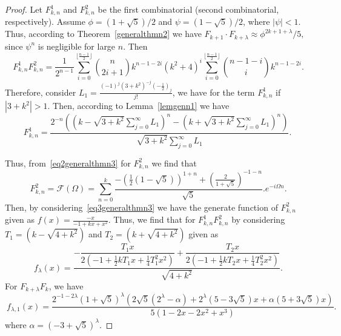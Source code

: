 \documentclass[11pt, a4paper]{article}
\theoremstyle{definition}
\begin{document}
\begin{proof}
Let $F^{1}_{k,n}$ and $F^{2}_{k,n}$ be the first combinatorial (second combinatorial, respectively). Assume $\phi = (1 + \sqrt{5})/2$ and $\psi = (1 - \sqrt{5})/2$, where $|\psi| < 1$. Thus, according to Theorem~\ref{generalthmn2} we have $F_{k+1} \cdot F_{k+\lambda} \approx \phi^{2k+1+\lambda}/5,$ since $\psi^n$ is negligible for large $n$. Then 
\begin{equation}~\label{eq2generalthmn3}
 F^{1}_{k,n}F^{2}_{k,n}= \frac{1}{2^{n-1}} \sum_{i=0}^{\lfloor \frac{n-1}{2} \rfloor} \binom{n}{2i+1} k^{n-1-2i} (k^2+4)^i  \sum_{i=0}^{\lfloor \frac{n-1}{2} \rfloor} \binom{n-1-i}{i} k^{n-1-2i}.  
\end{equation}
Therefore, consider $L_1=\frac{(-1)^j (3 + k^2)^{-j} \left( -\frac{1}{2} \right)_j}{j!}$, we have for the term $F^{1}_{k,n}$ if $|3+k^2|>1$. Then,  according to Lemma~\ref{lemgenn1} we have
\[
F^{1}_{k,n}=\frac{ 2^{-n} \left(  \left(  k - \sqrt{3 + k^2} \sum_{j=0}^{\infty} L_1 \right)^n - \left( k + \sqrt{3 + k^2} \sum_{j=0}^{\infty} L_1 \right)^n \right) }{
    \sqrt{3 + k^2} \sum_{j=0}^{\infty} L_1 }.
\]

Thus, from~\eqref{eq2generalthmn3} for $F^{2}_{k,n}$ we find that 
\begin{equation}~\label{eq3generalthmn3}
F^{2}_{k,n}=\mathcal{F}(\Omega) = \sum_{n=0}^{k}\frac{-\left(\frac{1}{2} \left(1-\sqrt{5}\right)\right)^{1+n}+\left(\frac{2}{1+\sqrt{5}}\right)^{-1-n}}{\sqrt{5}}. e^{-i \Omega n}.
\end{equation}
Then, by considering~\eqref{eq3generalthmn3} we have the generate function of $F^{2}_{k,n}$ given as $f(x)=\frac{-x}{-1+kx+x^2}.$
Thus, we find that for $ F^{1}_{k,n}F^{2}_{k,n}$ by considering $T_1=(k - \sqrt{4 + k^2})$ and $T_2=(k + \sqrt{4 + k^2})$ given as 
\begin{equation}~\label{eq4generalthmn3}
f_{\lambda}(x)=\dfrac{
-\dfrac{T_1 x}{
2 \left(-1 + \frac{1}{2} k T_1 x + \frac{1}{4} T_1^2 x^2 \right)}
+ \dfrac{T_2 x}{
2 \left(-1 + \frac{1}{2} k T_2 x + \frac{1}{4} T_2^2 x^2 \right)}
}{\sqrt{4 + k^2}}.
\end{equation}
For $F_{k+\lambda}F_{k}$, we have 
\begin{equation}~\label{eq5generalthmn3}
f_{\lambda,1}(x)=\frac{
2^{-1 - 2 \lambda} (1 + \sqrt{5})^{\lambda} \left( 2 \sqrt{5} \left( 2^{\lambda} - \alpha \right) + 2^{\lambda} (5 - 3 \sqrt{5}) x + \alpha (5 + 3 \sqrt{5}) x \right)
}{5 \left( 1 - 2 x - 2 x^{2} + x^{3} \right)}.
\end{equation}
where $\alpha=(-3 + \sqrt{5})^{\lambda}$. 


\end{proof}
\end{document}
